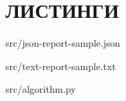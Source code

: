 \chapter{ЛИСТИНГИ}
\label{app:listings}


{src/json-report-sample.json}

\newpage


{src/text-report-sample.txt}

\newpage


{src/algorithm.py}
